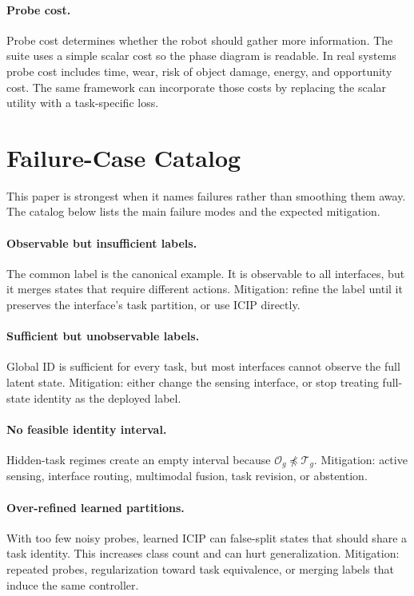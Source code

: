 \documentclass{article}
\newcommand{\icip}{\textsc{ICIP}}
\newcommand{\obs}{\mathcal{O}}
\newcommand{\task}{\mathcal{T}}
\begin{document}
\paragraph{Probe cost.}
Probe cost determines whether the robot should gather more information.
The suite uses a simple scalar cost so the phase diagram is readable.
In real systems probe cost includes time, wear, risk of object damage, energy, and opportunity cost.
The same framework can incorporate those costs by replacing the scalar utility with a task-specific loss.

\section{Failure-Case Catalog}

This paper is strongest when it names failures rather than smoothing them away.
The catalog below lists the main failure modes and the expected mitigation.

\paragraph{Observable but insufficient labels.}
The common label is the canonical example.
It is observable to all interfaces, but it merges states that require different actions.
Mitigation: refine the label until it preserves the interface's task partition, or use \icip{} directly.

\paragraph{Sufficient but unobservable labels.}
Global ID is sufficient for every task, but most interfaces cannot observe the full latent state.
Mitigation: either change the sensing interface, or stop treating full-state identity as the deployed label.

\paragraph{No feasible identity interval.}
Hidden-task regimes create an empty interval because $\obs_g\not\preceq\task_g$.
Mitigation: active sensing, interface routing, multimodal fusion, task revision, or abstention.

\paragraph{Over-refined learned partitions.}
With too few noisy probes, learned \icip{} can false-split states that should share a task identity.
This increases class count and can hurt generalization.
Mitigation: repeated probes, regularization toward task equivalence, or merging labels that induce the same controller.
\end{document}
